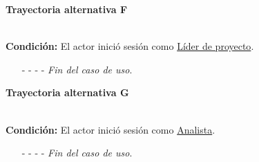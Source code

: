 	
	\hypertarget{CU1:TAF}{\textbf{Trayectoria alternativa F}}\\
	\noindent \textbf{Condición:} El actor inició sesión como \hyperlink{jefe}{Líder de proyecto}.
	\begin{enumerate}
		\UCpaso[\UCsist] Muestra la pantalla .
		\item[- -] - - {\em {Fin del caso de uso}}.
	\end{enumerate}

\hypertarget{CU1:TAG}{\textbf{Trayectoria alternativa G}}\\
\noindent \textbf{Condición:} El actor inició sesión como \hyperlink{analista}{Analista}.
\begin{enumerate}
	\UCpaso[\UCsist] Muestra la pantalla .
	\item[- -] - - {\em {Fin del caso de uso}}.
\end{enumerate}
